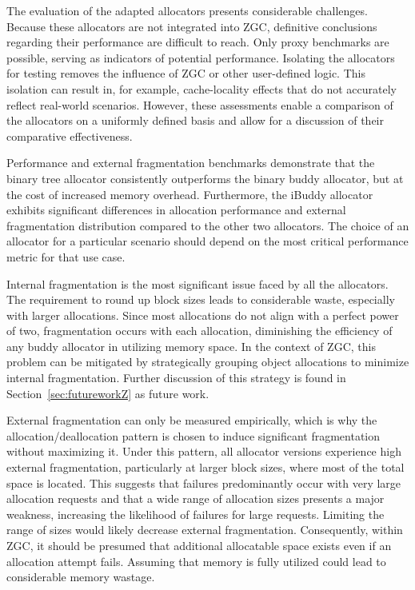 The evaluation of the adapted allocators presents considerable challenges. Because these allocators are not integrated into ZGC, definitive conclusions regarding their performance are difficult to reach. Only proxy benchmarks are possible, serving as indicators of potential performance. Isolating the allocators for testing removes the influence of ZGC or other user-defined logic. This isolation can result in, for example, cache-locality effects that do not accurately reflect real-world scenarios. However, these assessments enable a comparison of the allocators on a uniformly defined basis and allow for a discussion of their comparative effectiveness.

Performance and external fragmentation benchmarks demonstrate that the binary tree allocator consistently outperforms the binary buddy allocator, but at the cost of increased memory overhead. Furthermore, the iBuddy allocator exhibits significant differences in allocation performance and external fragmentation distribution compared to the other two allocators. The choice of an allocator for a particular scenario should depend on the most critical performance metric for that use case.

Internal fragmentation is the most significant issue faced by all the allocators. The requirement to round up block sizes leads to considerable waste, especially with larger allocations. Since most allocations do not align with a perfect power of two, fragmentation occurs with each allocation, diminishing the efficiency of any buddy allocator in utilizing memory space. In the context of ZGC, this problem can be mitigated by strategically grouping object allocations to minimize internal fragmentation. Further discussion of this strategy is found in Section~\ref{sec:futureworkZ} as future work.

External fragmentation can only be measured empirically, which is why the allocation/deallocation pattern is chosen to induce significant fragmentation without maximizing it. Under this pattern, all allocator versions experience high external fragmentation, particularly at larger block sizes, where most of the total space is located. This suggests that failures predominantly occur with very large allocation requests and that a wide range of allocation sizes presents a major weakness, increasing the likelihood of failures for large requests. Limiting the range of sizes would likely decrease external fragmentation. Consequently, within ZGC, it should be presumed that additional allocatable space exists even if an allocation attempt fails. Assuming that memory is fully utilized could lead to considerable memory wastage.

